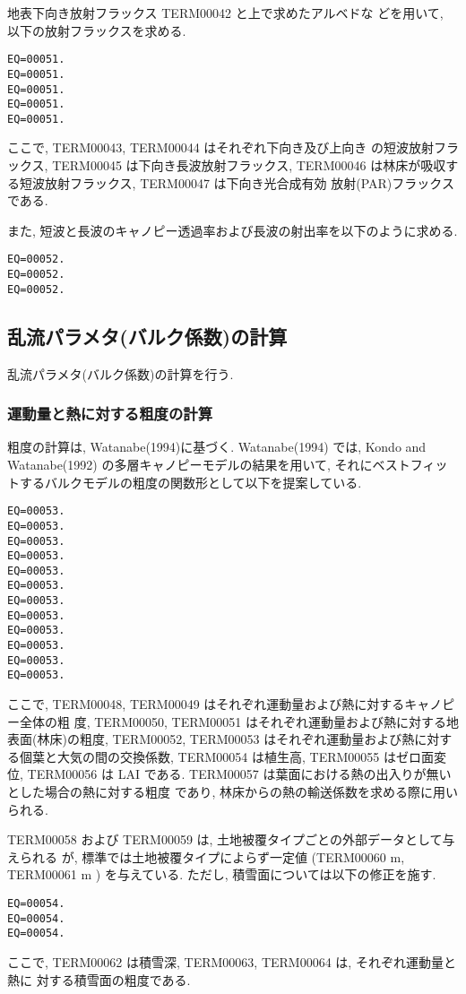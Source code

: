 地表下向き放射フラックス TERM00042 と上で求めたアルベドな
どを用いて, 以下の放射フラックスを求める.
\begin{verbatim}
EQ=00051.
EQ=00051.
EQ=00051.
EQ=00051.
EQ=00051.
\end{verbatim}
ここで, TERM00043, TERM00044 はそれぞれ下向き及び上向き
の短波放射フラックス, TERM00045 は下向き長波放射フラックス,
TERM00046 は林床が吸収する短波放射フラックス, TERM00047 は下向き光合成有効
放射(PAR)フラックスである.

また, 短波と長波のキャノピー透過率および長波の射出率を以下のように求める.
\begin{verbatim}
EQ=00052.
EQ=00052.
EQ=00052.
\end{verbatim}

\subsection{乱流パラメタ(バルク係数)の計算}

乱流パラメタ(バルク係数)の計算を行う.

\subsubsection{運動量と熱に対する粗度の計算}

粗度の計算は, Watanabe(1994)に基づく. Watanabe(1994) では, Kondo and
Watanabe(1992) の多層キャノピーモデルの結果を用いて, それにベストフィッ
トするバルクモデルの粗度の関数形として以下を提案している.

\begin{verbatim}
EQ=00053.
EQ=00053.
EQ=00053.
EQ=00053.
EQ=00053.
EQ=00053.
EQ=00053.
EQ=00053.
EQ=00053.
EQ=00053.
EQ=00053.
EQ=00053.
\end{verbatim}
ここで, TERM00048, TERM00049 はそれぞれ運動量および熱に対するキャノピー全体の粗
度, TERM00050, TERM00051 はそれぞれ運動量および熱に対する地表面(林床)の粗度,
TERM00052, TERM00053 はそれぞれ運動量および熱に対する個葉と大気の間の交換係数,
TERM00054 は植生高, TERM00055 はゼロ面変位, TERM00056 は LAI である.
TERM00057 は葉面における熱の出入りが無いとした場合の熱に対する粗度
であり, 林床からの熱の輸送係数を求める際に用いられる.

TERM00058 および TERM00059 は, 土地被覆タイプごとの外部データとして与えられる
が, 標準では土地被覆タイプによらず一定値 (TERM00060 m,
TERM00061 m ) を与えている.
ただし, 積雪面については以下の修正を施す.
\begin{verbatim}
EQ=00054.
EQ=00054.
EQ=00054.
\end{verbatim}
ここで, TERM00062 は積雪深, TERM00063, TERM00064 は, それぞれ運動量と熱に
対する積雪面の粗度である.

